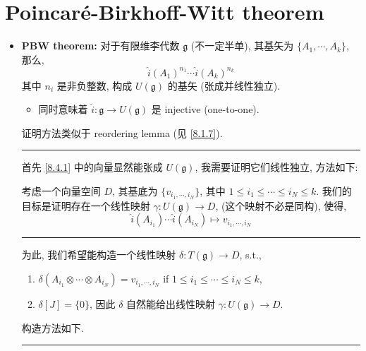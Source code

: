 \section{Poincaré-Birkhoff-Witt theorem}
\begin{itemize}
	\item \textbf{PBW theorem:} 对于有限维李代数 $\mathfrak{g}$ (不一定半单), 其基矢为 $\{A_1, \cdots, A_k\}$, 那么,
	\begin{equation} \label{8.4.1}
		\hat{i}(A_1)^{n_1} \cdots \hat{i}(A_k)^{n_k}
	\end{equation}
	其中 $n_i$ 是非负整数, 构成 $U(\mathfrak{g})$ 的基矢 (张成并线性独立).
	\begin{itemize}
		\item 同时意味着 $\hat{i} : \mathfrak{g} \rightarrow U(\mathfrak{g})$ 是 injective (one-to-one).
	\end{itemize}
	
	\begin{tcolorbox}[title=proof:]
		证明方法类似于 reordering lemma (见 \eqref{8.1.7}).
		
		\noindent\rule[0.5ex]{\linewidth}{0.5pt} %
		
		首先 \eqref{8.4.1} 中的向量显然能张成 $U(\mathfrak{g})$, 我需要证明它们线性独立, 方法如下:
		
		考虑一个向量空间 $D$, 其基底为 $\{v_{i_1, \cdots, i_N}\}$, 其中 $1 \leq i_1 \leq \cdots \leq i_N \leq k$. 我们的目标是证明存在一个线性映射 $\gamma : U(\mathfrak{g}) \rightarrow D$, (这个映射不必是同构), 使得,
		\begin{equation}
			\hat{i}(A_{i_1}) \cdots \hat{i}(A_{i_N}) \mapsto v_{i_1, \cdots, i_N}
		\end{equation}
		
		\noindent\rule[0.5ex]{\linewidth}{0.5pt} %
		
		为此, 我们希望能构造一个线性映射 $\delta : T(\mathfrak{g}) \rightarrow D$, s.t.,
		\begin{enumerate}
			\item $\delta(A_{i_1} \otimes \cdots \otimes A_{i_N}) = v_{i_1, \cdots, i_N}$ if $1 \leq i_1 \leq \cdots \leq i_N \leq k$,
			
			\item $\delta[J] = \{0\}$, 因此 $\delta$ 自然能给出线性映射 $\gamma : U(\mathfrak{g}) \rightarrow D$.
		\end{enumerate}
		构造方法如下.
		
		\noindent\rule[0.5ex]{\linewidth}{0.5pt} %
		

\end{tcolorbox}
\end{itemize}
